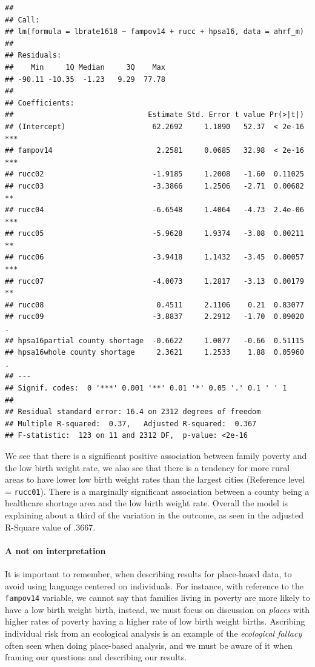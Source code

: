 \documentclass[
]{article}
\begin{document}
\begin{verbatim}
## 
## Call:
## lm(formula = lbrate1618 ~ fampov14 + rucc + hpsa16, data = ahrf_m)
## 
## Residuals:
##    Min     1Q Median     3Q    Max 
## -90.11 -10.35  -1.23   9.29  77.78 
## 
## Coefficients:
##                               Estimate Std. Error t value Pr(>|t|)    
## (Intercept)                    62.2692     1.1890   52.37  < 2e-16 ***
## fampov14                        2.2581     0.0685   32.98  < 2e-16 ***
## rucc02                         -1.9185     1.2008   -1.60  0.11025    
## rucc03                         -3.3866     1.2506   -2.71  0.00682 ** 
## rucc04                         -6.6548     1.4064   -4.73  2.4e-06 ***
## rucc05                         -5.9628     1.9374   -3.08  0.00211 ** 
## rucc06                         -3.9418     1.1432   -3.45  0.00057 ***
## rucc07                         -4.0073     1.2817   -3.13  0.00179 ** 
## rucc08                          0.4511     2.1106    0.21  0.83077    
## rucc09                         -3.8837     2.2912   -1.70  0.09020 .  
## hpsa16partial county shortage  -0.6622     1.0077   -0.66  0.51115    
## hpsa16whole county shortage     2.3621     1.2533    1.88  0.05960 .  
## ---
## Signif. codes:  0 '***' 0.001 '**' 0.01 '*' 0.05 '.' 0.1 ' ' 1
## 
## Residual standard error: 16.4 on 2312 degrees of freedom
## Multiple R-squared:  0.37,   Adjusted R-squared:  0.367 
## F-statistic:  123 on 11 and 2312 DF,  p-value: <2e-16
\end{verbatim}

We see that there is a significant positive association between family poverty and the low birth weight rate, we also see that there is a tendency for more rural areas to have lower low birth weight rates than the largest cities (Reference level = \texttt{rucc01}). There is a marginally significant association between a county being a healthcare shortage area and the low birth weight rate. Overall the model is explaining about a third of the variation in the outcome, as seen in the adjusted R-Square value of .3667.

\hypertarget{a-not-on-interpretation}{%
\paragraph{A not on interpretation}\label{a-not-on-interpretation}}

It is important to remember, when describing results for place-based data, to avoid using language centered on individuals. For instance, with reference to the \texttt{fampov14} variable, we cannot say that families living in poverty are more likely to have a low birth weight birth, instead, we must focus on discussion on \emph{places} with higher rates of poverty having a higher rate of low birth weight births. Ascribing individual risk from an ecological analysis is an example of the \emph{ecological fallacy} often seen when doing place-based analysis, and we must be aware of it when framing our questions and describing our results.
\end{document}
